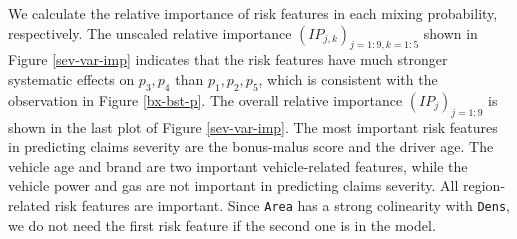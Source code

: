 \documentclass[11pt]{article}
\numberwithin{equation}{section}
\begin{document}
We calculate the relative importance of risk features in each mixing probability, respectively. 
The unscaled relative importance $(IP_{j,k})_{j=1:9,k=1:5}$ shown in Figure \ref{sev-var-imp} indicates that the risk features have much stronger systematic effects on $p_3,p_4$ than $p_1,p_2,p_5$, which is consistent with the observation in Figure \ref{bx-bst-p}.
The overall relative importance $(IP_{j})_{j=1:9}$ is shown in the last plot of Figure \ref{sev-var-imp}.
The most important risk features in predicting claims severity are the bonus-malus score and the driver age.   
The vehicle age and brand are two important vehicle-related features, while the vehicle power and gas are not important in predicting claims severity.
All region-related risk features are important. Since {\tt Area} has a strong colinearity with {\tt Dens}, we do not need the first risk feature if the second one is in the model.
\end{document}
